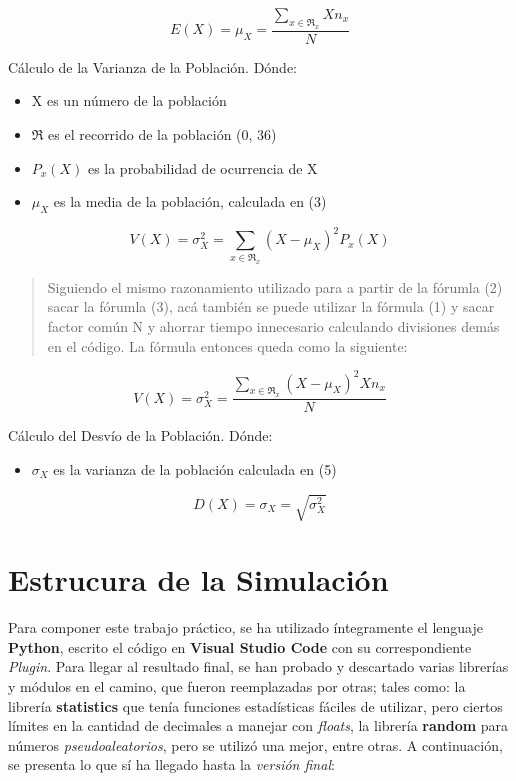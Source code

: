 \documentclass[a4paper]{article}
\begin{document}
\begin{equation}
    \textit{E}(X) = \mu_{X} = \frac { \sum_{x \in \Re_{x}}
    X n_{x} } { N }
\end{equation}

Cálculo de la Varianza de la Población. Dónde:
\begin{itemize}
    \item X es un número de la población
    \item \(\Re\) es el recorrido de la población (0, 36)
    \item \(P_{x}(X)\) es la probabilidad de ocurrencia de X
    \item \(\mu_{X}\) es la media de la población, calculada en (3)
\end{itemize}

\begin{equation}
    \textit{V}(X) = \sigma^2_{X} = \sum_{x \in \Re_{x}}
    (X - \mu_{X})^2 P_{x}(X)
\end{equation}

\begin{quote}
    Siguiendo el mismo razonamiento utilizado para a partir de la fórumla (2) sacar la fórumla (3), acá también se puede utilizar la fórmula (1) y sacar factor común N y ahorrar tiempo innecesario calculando divisiones demás en el código. La fórmula entonces queda como la siguiente:
\end{quote}

\begin{equation}
    \textit{V}(X) = \sigma^2_{X} = \frac { \sum_{x \in
    \Re_{x}} (X - \mu_{X})^2 X n_{x} } { N }
\end{equation}

Cálculo del Desvío de la Población. Dónde:
\begin{itemize}
    \item \(\sigma_{X}\) es la varianza de la población calculada en (5)
\end{itemize}

\begin{equation}
    \textit{D}(X) = \sigma_{X} = \sqrt{ \sigma^2_{X} }
\end{equation}


\section{Estrucura de la Simulación}
\label{sec:estructura}
Para componer este trabajo práctico, se ha utilizado íntegramente el lenguaje \textbf{Python}\cite{python_doc}, escrito el código en \textbf{Visual Studio Code}\cite{vs_code} con su correspondiente \textit{Plugin}. Para llegar al resultado final, se han probado y descartado varias librerías y módulos en el camino, que fueron reemplazadas por otras; tales como: la librería \textbf{statistics} que tenía funciones estadísticas fáciles de utilizar, pero ciertos límites en la cantidad de decimales a manejar con \textit{floats}, la librería \textbf{random} para números \textit{pseudoaleatorios}, pero se utilizó una mejor, entre otras. A continuación, se presenta lo que sí ha llegado hasta la \textit{versión final}:
\end{document}
